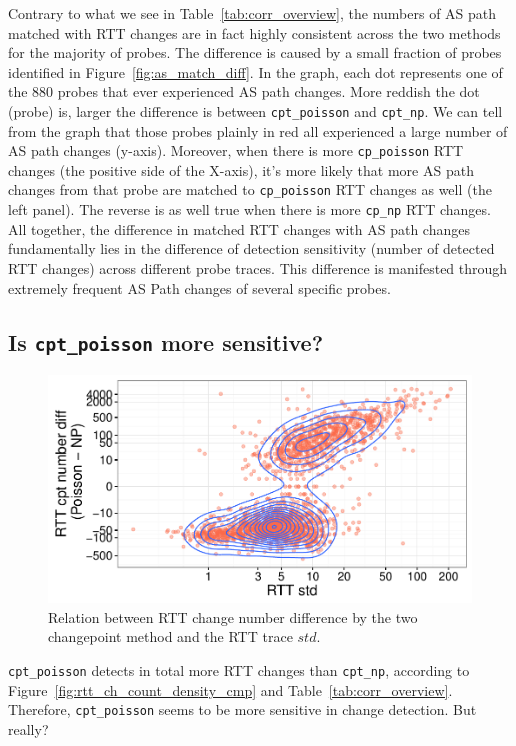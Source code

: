 Contrary to what we see in Table~\ref{tab:corr_overview}, the numbers of AS path matched with RTT changes are in fact highly consistent across the two methods for the majority of probes.
The difference is caused by a small fraction of probes identified in Figure~\ref{fig:as_match_diff}.
In the graph, each dot represents one of the 880 probes that ever experienced AS path changes.
More reddish the dot (probe) is, larger the difference is between \texttt{cpt\_poisson} and \texttt{cpt\_np}.
We can tell from the graph that those probes plainly in red all experienced a large number of AS path changes (y-axis).
Moreover, when there is more \texttt{cp\_poisson} RTT changes (the positive side of the X-axis), it's more likely that more AS path changes from that probe are matched to \texttt{cp\_poisson} RTT changes as well (the left panel).
The reverse is as well true when there is more \texttt{cp\_np} RTT changes.
All together, the difference in matched RTT changes with AS path changes fundamentally lies in the difference of detection sensitivity (number of detected RTT changes) across different probe traces.
This difference is manifested through extremely frequent AS Path changes of several specific probes.


\subsection{Is \texttt{cpt\_poisson} more sensitive?}
\label{sec:over_sensitive}
\begin{figure}[!htb]
\centering
\includegraphics[width=.64\textwidth]{gfx/chap4/cpt_diff_vs_std.pdf}
\caption{Relation between RTT change number difference by the two changepoint method and the RTT trace $std$.}
\label{fig:cpt_diff_vs_std}
\end{figure}

\texttt{cpt\_poisson} detects in total more RTT changes than \texttt{cpt\_np}, according to Figure~\ref{fig:rtt_ch_count_density_cmp} and Table~\ref{tab:corr_overview}.
Therefore, \texttt{cpt\_poisson} seems to be more sensitive in change detection. But really?

